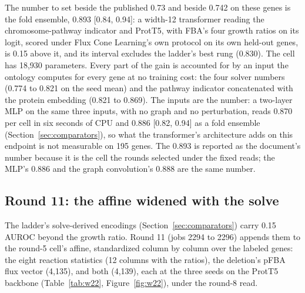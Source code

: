 


The number to set beside the published 0.73 and beside 0.742 on these genes is the fold
ensemble, 0.893 [0.84, 0.94]: a width-12 transformer reading the chromosome-pathway
indicator and ProtT5, with FBA's four growth ratios on its logit, scored under Flux Cone
Learning's own protocol on its own held-out genes, is 0.15 above it, and its interval
excludes the ladder's best rung (0.830). The cell has 18,930 parameters. Every part of the
gain is accounted for by an input the ontology computes for every gene at no training
cost: the four solver numbers (0.774 to 0.821 on the seed mean) and the pathway
indicator concatenated with the protein embedding (0.821 to 0.869). The inputs are the
number: a two-layer MLP on the same three inputs, with no graph and no perturbation,
reads 0.870 per cell in six seconds of CPU and 0.886 [0.82, 0.94] as a fold ensemble
(Section~\ref{sec:comparators}), so what the transformer's architecture adds on this
endpoint is not measurable on 195 genes. The 0.893 is reported as the document's number
because it is the cell the rounds selected under the fixed reads; the MLP's 0.886 and
the graph convolution's 0.888 are the same number.

\subsection{Round 11: the affine widened with the solve}

The ladder's solve-derived encodings (Section~\ref{sec:comparators}) carry 0.15 AUROC
beyond the growth ratio. Round 11 (jobs 2294 to 2296) appends them to the round-5 cell's
affine, standardized column by column over the labeled genes: the eight reaction
statistics (12 columns with the ratios), the deletion's pFBA flux vector (4,135), and
both (4,139), each at the three seeds on the ProtT5 backbone (Table~\ref{tab:w22},
Figure~\ref{fig:w22}), under the round-8 read.

